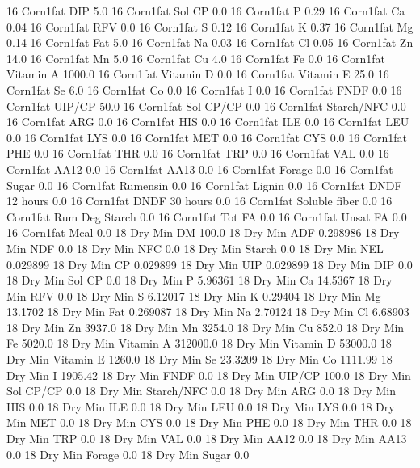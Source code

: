 \documentclass[letterpaper,10pt,english]{sphinxmanual}
\begin{document}
\begin{sphinxVerbatim}[commandchars=\\\{\},numbers=left,firstnumber=1,stepnumber=1]
16 Corn1\PYGZpc{}fat DIP 5.0
16 Corn1\PYGZpc{}fat Sol CP 0.0
16 Corn1\PYGZpc{}fat P 0.29
16 Corn1\PYGZpc{}fat Ca 0.04
16 Corn1\PYGZpc{}fat RFV 0.0
16 Corn1\PYGZpc{}fat S 0.12
16 Corn1\PYGZpc{}fat K 0.37
16 Corn1\PYGZpc{}fat Mg 0.14
16 Corn1\PYGZpc{}fat Fat 5.0
16 Corn1\PYGZpc{}fat Na 0.03
16 Corn1\PYGZpc{}fat Cl 0.05
16 Corn1\PYGZpc{}fat Zn 14.0
16 Corn1\PYGZpc{}fat Mn 5.0
16 Corn1\PYGZpc{}fat Cu 4.0
16 Corn1\PYGZpc{}fat Fe 0.0
16 Corn1\PYGZpc{}fat Vitamin A 1000.0
16 Corn1\PYGZpc{}fat Vitamin D 0.0
16 Corn1\PYGZpc{}fat Vitamin E 25.0
16 Corn1\PYGZpc{}fat Se 6.0
16 Corn1\PYGZpc{}fat Co 0.0
16 Corn1\PYGZpc{}fat I 0.0
16 Corn1\PYGZpc{}fat FNDF 0.0
16 Corn1\PYGZpc{}fat UIP/CP 50.0
16 Corn1\PYGZpc{}fat Sol CP/CP 0.0
16 Corn1\PYGZpc{}fat Starch/NFC 0.0
16 Corn1\PYGZpc{}fat ARG 0.0
16 Corn1\PYGZpc{}fat HIS 0.0
16 Corn1\PYGZpc{}fat ILE 0.0
16 Corn1\PYGZpc{}fat LEU 0.0
16 Corn1\PYGZpc{}fat LYS 0.0
16 Corn1\PYGZpc{}fat MET 0.0
16 Corn1\PYGZpc{}fat CYS 0.0
16 Corn1\PYGZpc{}fat PHE 0.0
16 Corn1\PYGZpc{}fat THR 0.0
16 Corn1\PYGZpc{}fat TRP 0.0
16 Corn1\PYGZpc{}fat VAL 0.0
16 Corn1\PYGZpc{}fat AA\PYGZsh{}12 0.0
16 Corn1\PYGZpc{}fat AA\PYGZsh{}13 0.0
16 Corn1\PYGZpc{}fat \PYGZpc{} Forage 0.0
16 Corn1\PYGZpc{}fat Sugar \PYGZpc{} 0.0
16 Corn1\PYGZpc{}fat Rumensin 0.0
16 Corn1\PYGZpc{}fat Lignin 0.0
16 Corn1\PYGZpc{}fat DNDF 12 hours 0.0
16 Corn1\PYGZpc{}fat DNDF 30 hours 0.0
16 Corn1\PYGZpc{}fat Soluble fiber 0.0
16 Corn1\PYGZpc{}fat Rum Deg Starch 0.0
16 Corn1\PYGZpc{}fat Tot FA 0.0
16 Corn1\PYGZpc{}fat Unsat FA 0.0
16 Corn1\PYGZpc{}fat Mcal 0.0
18 Dry Min DM 100.0
18 Dry Min ADF 0.298986
18 Dry Min NDF 0.0
18 Dry Min NFC 0.0
18 Dry Min Starch 0.0
18 Dry Min NEL 0.029899
18 Dry Min CP 0.029899
18 Dry Min UIP 0.029899
18 Dry Min DIP 0.0
18 Dry Min Sol CP 0.0
18 Dry Min P 5.96361
18 Dry Min Ca 14.5367
18 Dry Min RFV 0.0
18 Dry Min S 6.12017
18 Dry Min K 0.29404
18 Dry Min Mg 13.1702
18 Dry Min Fat 0.269087
18 Dry Min Na 2.70124
18 Dry Min Cl 6.68903
18 Dry Min Zn 3937.0
18 Dry Min Mn 3254.0
18 Dry Min Cu 852.0
18 Dry Min Fe 5020.0
18 Dry Min Vitamin A 312000.0
18 Dry Min Vitamin D 53000.0
18 Dry Min Vitamin E 1260.0
18 Dry Min Se 23.3209
18 Dry Min Co 1111.99
18 Dry Min I 1905.42
18 Dry Min FNDF 0.0
18 Dry Min UIP/CP 100.0
18 Dry Min Sol CP/CP 0.0
18 Dry Min Starch/NFC 0.0
18 Dry Min ARG 0.0
18 Dry Min HIS 0.0
18 Dry Min ILE 0.0
18 Dry Min LEU 0.0
18 Dry Min LYS 0.0
18 Dry Min MET 0.0
18 Dry Min CYS 0.0
18 Dry Min PHE 0.0
18 Dry Min THR 0.0
18 Dry Min TRP 0.0
18 Dry Min VAL 0.0
18 Dry Min AA\PYGZsh{}12 0.0
18 Dry Min AA\PYGZsh{}13 0.0
18 Dry Min \PYGZpc{} Forage 0.0
18 Dry Min Sugar \PYGZpc{} 0.0

\end{sphinxVerbatim}
\end{document}
